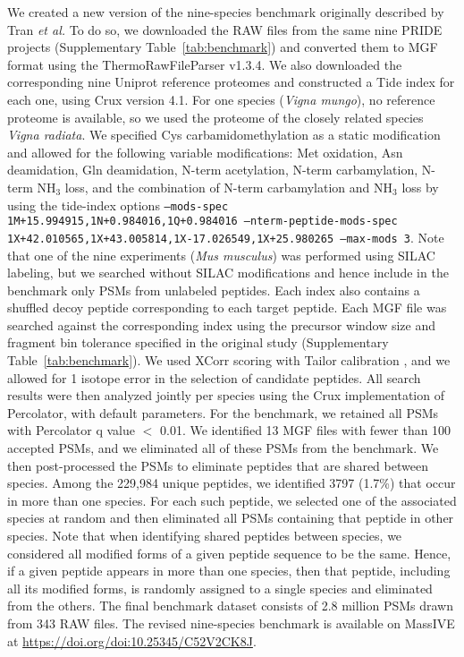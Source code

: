 \documentclass{article}
\newcommand{\fixme}[1]{{\color{red}{\bf FIXME: #1}\color{black}}}
\begin{document}
\fixme{I need to rewrite this paragraph to avoid self-plagiarism. ---Bill}
\begin{sloppypar}
We created a new version of the nine-species benchmark originally described by Tran {\em et al.} \cite{tran2017denovo}
To do so, we downloaded the RAW files from the same nine PRIDE projects (Supplementary Table~\ref{tab:benchmark}) and converted them to MGF format using the ThermoRawFileParser v1.3.4.
We also downloaded the corresponding nine Uniprot reference proteomes and constructed a Tide index for each one, using Crux version 4.1.
For one species (\textit{Vigna mungo}), no reference proteome is available, so we used the proteome of the closely related species \textit{Vigna radiata}.
We specified Cys carbamidomethylation as a static modification and allowed for the following variable modifications: Met oxidation, Asn deamidation, Gln deamidation, N-term acetylation, N-term carbamylation, N-term NH$_{3}$ loss, and the combination of N-term carbamylation and NH$_{3}$ loss by using the tide-index options {\tt --mods-spec 1M+15.994915,\allowbreak 1N+0.984016,\allowbreak 1Q+0.984016 --nterm-peptide-mods-spec 1X+42.010565,\allowbreak 1X+43.005814,\allowbreak 1X-17.026549,\allowbreak 1X+25.980265 --max-mods 3}.
Note that one of the nine experiments (\textit{Mus musculus}) was performed using SILAC labeling, but we searched without SILAC modifications and hence include in the benchmark only PSMs from unlabeled peptides.
Each index also contains a shuffled decoy peptide corresponding to each target peptide.
Each MGF file was searched against the corresponding index using the precursor window size and fragment bin tolerance specified in the original study (Supplementary Table~\ref{tab:benchmark}).
We used XCorr scoring with Tailor calibration \cite{sulimov2020tailor}, and we allowed for 1 isotope error in the selection of candidate peptides.
All search results were then analyzed jointly per species using the Crux implementation of Percolator, with default parameters.
For the benchmark, we retained all PSMs with Percolator q value $<$ 0.01.
We identified 13 MGF files with fewer than 100 accepted PSMs, and we eliminated all of these PSMs from the benchmark.
We then post-processed the PSMs to eliminate peptides that are shared between species.
Among the 229,984 unique peptides, we identified 3797 (1.7\%) that occur in more than one species.
For each such peptide, we selected one of the associated species at random and then eliminated all PSMs containing that peptide in other species.
Note that when identifying shared peptides between species, we
considered all modified forms of a given peptide sequence to be the
same.  Hence, if a given peptide appears in more than one species,
then that peptide, including all its modified forms, is randomly
assigned to a single species and eliminated from the others.
The final benchmark dataset consists of 2.8 million PSMs drawn from 343 RAW files.
The revised nine-species benchmark is available on MassIVE at \url{https://doi.org/doi:10.25345/C52V2CK8J}.
\end{sloppypar}
\end{document}
